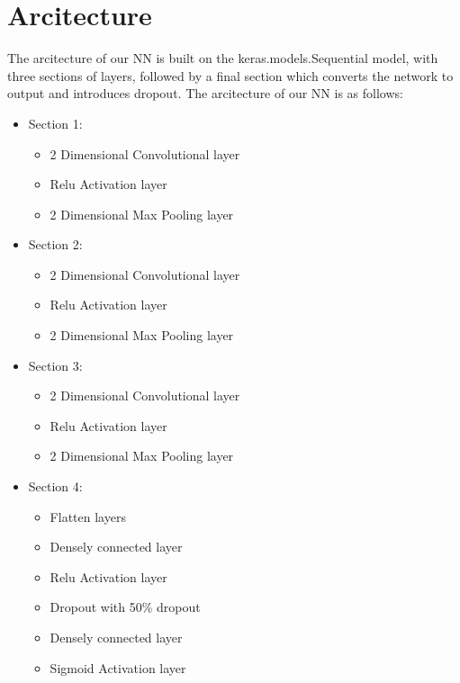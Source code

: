 \documentclass[12pt]{article}
\begin{document}
\section{Arcitecture}
{

	\quad The arcitecture of our NN is built on the keras.models.Sequential model, with three sections of layers, followed by a final section which converts the network to output and introduces dropout. The arcitecture of our NN is as follows: 

	\begin{itemize}
		\item{Section 1:}
		\begin{itemize}
			\item{2 Dimensional Convolutional layer} 
			\item{Relu Activation layer}
			\item{2 Dimensional Max Pooling layer}
		\end{itemize}
		\item{Section 2:}
		\begin{itemize}
			\item{2 Dimensional Convolutional layer} 
			\item{Relu Activation layer}
			\item{2 Dimensional Max Pooling layer}
		\end{itemize}
		\item{Section 3:}
		\begin{itemize}
			\item{2 Dimensional Convolutional layer} 
			\item{Relu Activation layer}
			\item{2 Dimensional Max Pooling layer}
		\end{itemize}
		\item{Section 4:}
		\begin{itemize}
			\item{Flatten layers}
			\item{Densely connected layer}
			\item{Relu Activation layer}
			\item{Dropout with 50\% dropout}
			\item{Densely connected layer}
			\item{Sigmoid Activation layer}
		\end{itemize}
	\end{itemize}
}
\end{document}
